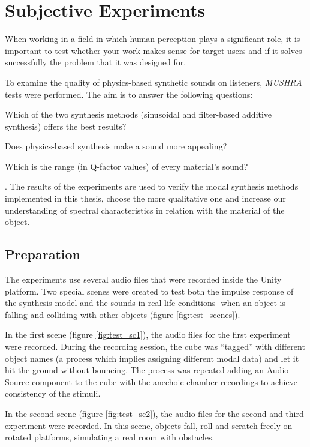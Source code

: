 \chapter{Subjective Experiments}\label{ch:tests}
When working in a field in which human perception plays a significant role, it is important to test whether your work makes sense for target users and if it solves successfully the problem that it was designed for.

To examine the quality of physics-based synthetic sounds on listeners,  \textit{MUSHRA}\cite{series2014method} tests were performed. The aim is to answer the following questions: \begin{inparaenum}[1)]
\item Which of the two synthesis methods (sinusoidal and filter-based additive synthesis) offers the best results? 
\item Does physics-based synthesis make a sound more appealing?
\item Which is the range (in Q-factor values) of every material's sound?
\end{inparaenum}.
The results of the experiments are used to verify the modal synthesis methods implemented in this thesis, choose the more qualitative one and increase our understanding of spectral characteristics in relation with the material of the object. 

\section{Preparation}
The experiments use several audio files that were recorded inside the Unity\textsuperscript{\textregistered} platform. Two special scenes were created to test both the impulse response of the synthesis model and the sounds in real-life conditions -when an object is falling and colliding with other objects (figure \ref{fig:test_scenes}). 

In the first scene (figure \ref{fig:test_sc1}), the audio files for the first experiment were recorded. During the recording session, the cube was ``tagged'' with different object names (a process which implies assigning different modal data) and let it hit the ground without bouncing. The process was repeated adding an Audio Source component to the cube with the anechoic chamber recordings to achieve consistency of the stimuli.

In the second scene (figure \ref{fig:test_sc2}), the audio files for the second and third experiment were recorded. In this scene, objects fall, roll and scratch freely on rotated platforms, simulating a real room with obstacles.

